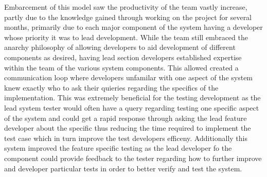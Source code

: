 \documentclass{l3proj}
\begin{document}
Embarcement of this model saw the productivity of the team vastly increase, partly due to the knowledge gained through working on the project for several months, primarily due to each major component of the system having a developer whose priority it was to lead development. 
While the team still embraced the anarchy philosophy of allowing developers to aid development of different components as desired, having lead section developers established expertise within the team of the various system components. This allowed created a communication loop where developers unfamilar with one aspect of the system knew exactly who to ask their quieries regarding the specifics of the implementation. This was extremely beneficial for the testing development as the lead system tester would often have a query regarding testing one specific aspect of the system and could get a rapid response through asking the lead feature developer about the specific thus reducing the time required to implement the test case which in turn improve the test developers efficeny. Additionally this system improved the feature specific testing as the lead developer fo the component could provide feedback to the tester regarding how to further improve and developer particular tests in order to better verify and test the system.   
\end{document}
